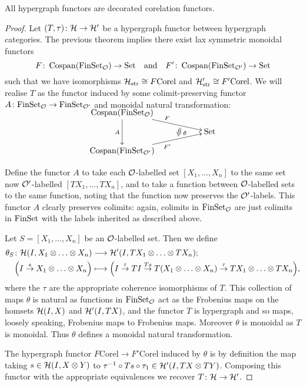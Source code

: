 \begin{theorem} \label{thm.hypdeccorfunctors}
  All hypergraph functors are decorated corelation functors.
\end{theorem}
\begin{proof}
  Let $(T,\tau){\colon} \mathcal H \to \mathcal H'$ be a hypergraph functor between
  hypergraph categories. The previous theorem implies there exist lax symmetric
  monoidal functors 
  \[
    F{\colon} \operatorname{{Cospan}}(\mathrm{FinSet}_{\mathcal O}) \to \mathrm{Set} \quad \mbox{and} \quad F'{\colon}
    \operatorname{{Cospan}}(\mathrm{FinSet}_{\mathcal O'}) \to \mathrm{Set}
  \]
  such that we have isomorphisms $\mathcal
  H_{\mathrm{str}} \cong F\mathrm{Corel}$ and $\mathcal H_{\mathrm{str}}' \cong
  F'\mathrm{Corel}$. We will realise $T$ as the functor induced by some
  colimit-preserving functor $A{\colon} \mathrm{FinSet}_{\mathcal O} \to \mathrm{FinSet}_{\mathcal O'}$ and
  monoidal natural transformation:
  \[
    \xymatrixrowsep{2ex}
    \xymatrix{
      \cospan(\FinSet_{\mc O}) \ar[dd]_{A} \ar[drr]^F  \\
      &\twocell \omit{_\:\theta}& \Set \\
      \cospan(\FinSet_{\mc O'}) \ar[urr]_{F'} 
    }
  \]

  Define the functor $A$ to take each $\mathcal O$-labelled set $[X_1,\dots,X_n]$ to
  the same set now $\mathcal O'$-labelled $[TX_1,\dots,TX_n]$, and to take a function
  between $\mathcal O$-labelled sets to the same function, noting that the function
  now preserves the $\mathcal O'$-labels. This functor $A$ clearly preserves
  colimits: again, colimits in $\mathrm{FinSet}_{\mathcal O}$ are just colimits in $\mathrm{FinSet}$
  with the labels inherited as described above.

  Let $S=[X_1,\dots,X_n]$ be an $\mathcal O$-labelled set. Then we define
  \begin{align*}
    \theta_S\maps \mc H(I,X_1 \ot \dots \ot X_n) &\longrightarrow \mc H'(I, TX_1
    \ot \dots \ot TX_n); \\
    \Big(I \stackrel{s}\to X_1\ot \dots \ot X_n\Big) &\longmapsto \Big(I
    \stackrel{\tau}\to TI \stackrel{Ts}\to T(X_1\ot \dots \ot X_n)
    \stackrel{\tau}\to TX_1 \ot \dots \ot TX_n\Big), 
  \end{align*}
  where the $\tau$ are the appropriate coherence isomorphisms of $T$. This
  collection of maps $\theta$ is natural as functions in $\mathrm{FinSet}_{\mathcal O}$ act
  as the Frobenius maps on the homsets $\mathcal H(I,X)$ and $\mathcal H'(I,TX)$, and the
  functor $T$ is hypergraph and so maps, loosely speaking, Frobenius maps to
  Frobenius maps. Moreover $\theta$ is monoidal as $T$ is monoidal.  Thus
  $\theta$ defines a monoidal natural transformation.

  The hypergraph functor $F\mathrm{Corel} \to F'\mathrm{Corel}$ induced by
  $\theta$ is by definition the map taking $s \in \mathcal H(I,X \otimes Y)$ to
  $\tau^{-1} \circ Ts \circ \tau_1 \in \mathcal H'(I,TX \otimes TY)$. Composing this
  functor with the appropriate equivalences we recover $T {\colon} \mathcal H \to \mathcal
  H'$.
\end{proof}

